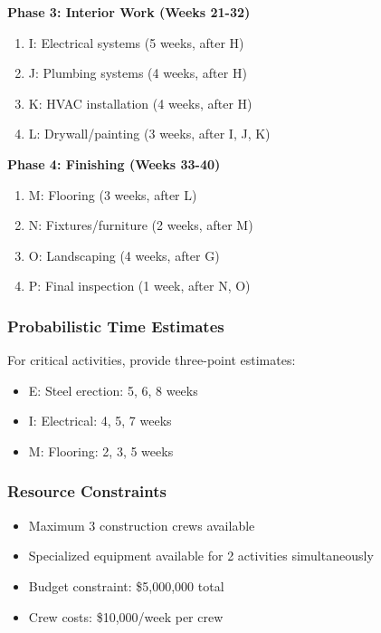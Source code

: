 \documentclass[
  letterpaper,
  DIV=11,
  numbers=noendperiod]{scrreprt}
\providecommand{\tightlist}{%
  \setlength{\itemsep}{0pt}\setlength{\parskip}{0pt}}
\begin{document}
\textbf{Phase 3: Interior Work (Weeks 21-32)}

\begin{enumerate}
\def\labelenumi{\arabic{enumi}.}
\setcounter{enumi}{8}
\tightlist
\item
  I: Electrical systems (5 weeks, after H)
\item
  J: Plumbing systems (4 weeks, after H)
\item
  K: HVAC installation (4 weeks, after H)
\item
  L: Drywall/painting (3 weeks, after I, J, K)
\end{enumerate}

\textbf{Phase 4: Finishing (Weeks 33-40)}

\begin{enumerate}
\def\labelenumi{\arabic{enumi}.}
\setcounter{enumi}{12}
\tightlist
\item
  M: Flooring (3 weeks, after L)
\item
  N: Fixtures/furniture (2 weeks, after M)
\item
  O: Landscaping (4 weeks, after G)
\item
  P: Final inspection (1 week, after N, O)
\end{enumerate}

\subsubsection{Probabilistic Time
Estimates}\label{probabilistic-time-estimates}

For critical activities, provide three-point estimates:

\begin{itemize}
\tightlist
\item
  E: Steel erection: 5, 6, 8 weeks
\item
  I: Electrical: 4, 5, 7 weeks
\item
  M: Flooring: 2, 3, 5 weeks
\end{itemize}

\subsubsection{Resource Constraints}\label{resource-constraints}

\begin{itemize}
\tightlist
\item
  Maximum 3 construction crews available
\item
  Specialized equipment available for 2 activities simultaneously
\item
  Budget constraint: \$5,000,000 total
\item
  Crew costs: \$10,000/week per crew
\end{itemize}
\end{document}
